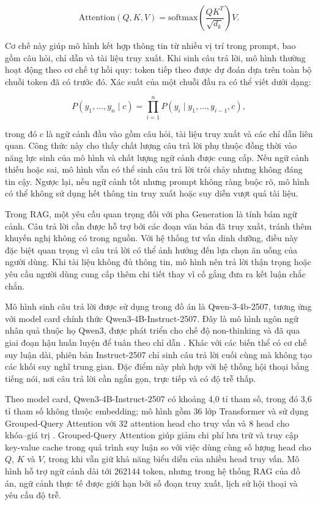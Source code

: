 \documentclass[a4paper,13pt,twoside]{report}
\begin{document}
\begin{equation}
    \mathrm{Attention}(Q,K,V)
    =
    \mathrm{softmax}\left(
    \frac{QK^{T}}{\sqrt{d_k}}
    \right)V.
\end{equation}

Cơ chế này giúp mô hình kết hợp thông tin từ nhiều vị trí trong prompt, bao gồm câu hỏi, chỉ dẫn và tài liệu truy xuất. Khi sinh câu trả lời, mô hình thường hoạt động theo cơ chế tự hồi quy: token tiếp theo được dự đoán dựa trên toàn bộ chuỗi token đã có trước đó. Xác suất của một chuỗi đầu ra có thể viết dưới dạng:

\begin{equation}
    P(y_1,\ldots,y_n \mid c)
    =
    \prod_{i=1}^{n}P(y_i \mid y_1,\ldots,y_{i-1},c),
\end{equation}

trong đó \(c\) là ngữ cảnh đầu vào gồm câu hỏi, tài liệu truy xuất và các chỉ dẫn liên quan. Công thức này cho thấy chất lượng câu trả lời phụ thuộc đồng thời vào năng lực sinh của mô hình và chất lượng ngữ cảnh được cung cấp. Nếu ngữ cảnh thiếu hoặc sai, mô hình vẫn có thể sinh câu trả lời trôi chảy nhưng không đáng tin cậy. Ngược lại, nếu ngữ cảnh tốt nhưng prompt không ràng buộc rõ, mô hình có thể không sử dụng hết thông tin truy xuất hoặc suy diễn vượt quá tài liệu.

Trong RAG, một yêu cầu quan trọng đối với pha Generation là tính bám ngữ cảnh. Câu trả lời cần được hỗ trợ bởi các đoạn văn bản đã truy xuất, tránh thêm khuyến nghị không có trong nguồn. Với hệ thống tư vấn dinh dưỡng, điều này đặc biệt quan trọng vì câu trả lời có thể ảnh hưởng đến lựa chọn ăn uống của người dùng. Khi tài liệu không đủ thông tin, mô hình nên trả lời thận trọng hoặc yêu cầu người dùng cung cấp thêm chi tiết thay vì cố gắng đưa ra kết luận chắc chắn.

Mô hình sinh câu trả lời được sử dụng trong đồ án là Qwen-3-4b-2507, tương ứng với model card chính thức Qwen3-4B-Instruct-2507. Đây là mô hình ngôn ngữ nhân quả thuộc họ Qwen3, được phát triển cho chế độ non-thinking và đã qua giai đoạn hậu huấn luyện để tuân theo chỉ dẫn \cite{qwen3,qwen3modelcard}. Khác với các biến thể có cơ chế suy luận dài, phiên bản Instruct-2507 chỉ sinh câu trả lời cuối cùng mà không tạo các khối suy nghĩ trung gian. Đặc điểm này phù hợp với hệ thống hội thoại bằng tiếng nói, nơi câu trả lời cần ngắn gọn, trực tiếp và có độ trễ thấp.

Theo model card, Qwen3-4B-Instruct-2507 có khoảng 4,0 tỉ tham số, trong đó 3,6 tỉ tham số không thuộc embedding; mô hình gồm 36 lớp Transformer và sử dụng Grouped-Query Attention với 32 attention head cho truy vấn và 8 head cho khóa--giá trị \cite{qwen3modelcard}. Grouped-Query Attention giúp giảm chi phí lưu trữ và truy cập key-value cache trong quá trình suy luận so với việc dùng cùng số lượng head cho \(Q\), \(K\) và \(V\), trong khi vẫn giữ khả năng biểu diễn của nhiều head truy vấn. Mô hình hỗ trợ ngữ cảnh dài tới 262144 token, nhưng trong hệ thống RAG của đồ án, ngữ cảnh thực tế được giới hạn bởi số đoạn truy xuất, lịch sử hội thoại và yêu cầu độ trễ.
\end{document}
